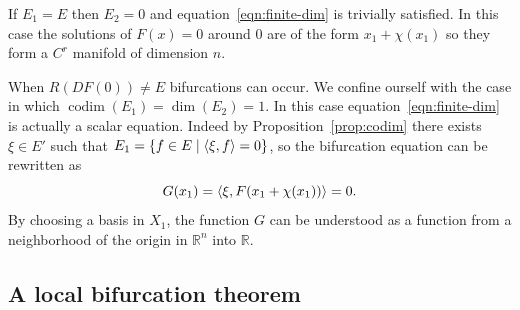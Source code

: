 \documentclass[a4paper,11pt]{article}
\theoremstyle{definition}
\DeclareMathOperator{\codim}{codim}
\DeclarePairedDelimiter{\dual}{\langle}{\rangle}
\begin{document}
If $E_1=E$ then $E_2=0$ and equation~\eqref{eqn:finite-dim} is trivially satisfied. In this case the solutions of $F(x)=0$ around 0 are of the form $x_1+\chi(x_1)$ so they form a $C^r$ manifold of dimension $n$.

When $R(DF(0))\neq E$ bifurcations can occur. We confine ourself with the case in which $\codim(E_1)=\dim(E_2)=1$. In this case equation~\eqref{eqn:finite-dim} is actually a scalar equation. Indeed by Proposition~\ref{prop:codim} there exists $\xi\in E'$ such that $E_1=\{f\in E\;|\;\dual{\xi,f}=0\}$, so the bifurcation equation can be rewritten as
\[
G(x_1)=\dual{\xi,F(x_1+\chi(x_1))}=0.
\]
By choosing a basis in $X_1$, the function $G$ can be understood as a function from a neighborhood of the origin in $\mathbb{R}^n$ into $\mathbb{R}$.

\subsection{A local bifurcation theorem}
\end{document}
